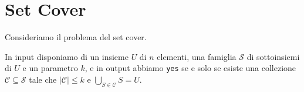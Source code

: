 \section{Set Cover}
Consideriamo il problema del set cover.

In input disponiamo di un insieme $U$ di $n$ elementi, una famiglia $\mathcal{S}$ di sottoinsiemi
di $U$ e un parametro $k$, e in output abbiamo \texttt{yes} se e solo se esiste una collezione
$\mathcal{C} \subseteq \mathcal{S}$ tale che $|\mathcal{C}| \leq k$ e $\bigcup_{S \in \mathcal{C}} S = U$.
